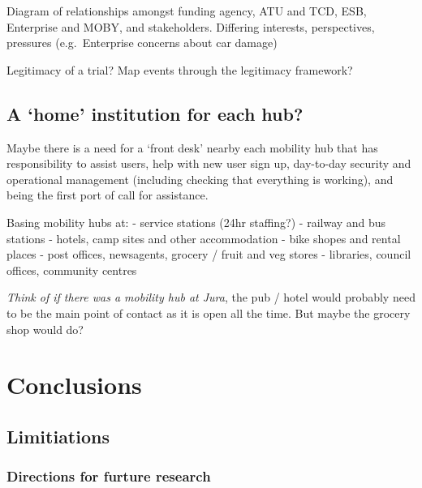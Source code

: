 \documentclass[preprint, 3p,
authoryear]{elsarticle} %
\begin{document}
Diagram of relationships amongst funding agency, ATU and TCD, ESB,
Enterprise and MOBY, and stakeholders. Differing interests,
perspectives, pressures (e.g.~Enterprise concerns about car damage)

Legitimacy of a trial? Map events through the legitimacy framework?

\subsection{A `home' institution for each
hub?}\label{a-home-institution-for-each-hub}

Maybe there is a need for a `front desk' nearby each mobility hub that
has responsibility to assist users, help with new user sign up,
day-to-day security and operational management (including checking that
everything is working), and being the first port of call for assistance.

Basing mobility hubs at: - service stations (24hr staffing?) - railway
and bus stations - hotels, camp sites and other accommodation - bike
shopes and rental places - post offices, newsagents, grocery / fruit and
veg stores - libraries, council offices, community centres

\emph{Think of if there was a mobility hub at Jura}, the pub / hotel
would probably need to be the main point of contact as it is open all
the time. But maybe the grocery shop would do?

\section{Conclusions}\label{conclusions}

\subsection{Limitiations}\label{limitiations}

\subsubsection{Directions for furture
research}\label{directions-for-furture-research}

\vspace{2cm}
\end{document}

